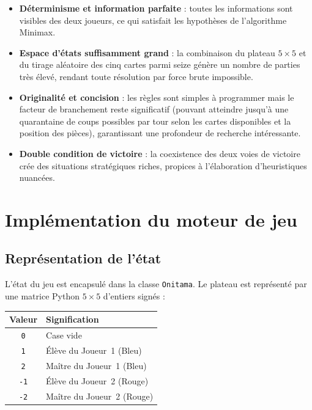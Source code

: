 \documentclass[12pt, a4paper]{article}
\begin{document}
\begin{itemize}
  \item \textbf{Déterminisme et information parfaite} : toutes les informations sont visibles
        des deux joueurs, ce qui satisfait les hypothèses de l'algorithme Minimax.
  \item \textbf{Espace d'états suffisamment grand} : la combinaison du plateau $5\times5$ et
        du tirage aléatoire des cinq cartes parmi seize génère un nombre de parties très élevé,
        rendant toute résolution par force brute impossible.
        \item \textbf{Originalité et concision} : les règles sont simples à programmer mais le facteur de branchement reste significatif (pouvant atteindre jusqu'à une quarantaine de coups possibles par tour selon les cartes disponibles et la position des pièces), garantissant une profondeur de recherche intéressante.
        \item \textbf{Double condition de victoire} : la coexistence des deux voies de victoire
        crée des situations stratégiques riches, propices à l'élaboration d'heuristiques
        nuancées.
\end{itemize}

\section{Implémentation du moteur de jeu}
\label{sec:moteur}

\subsection{Représentation de l'état}

L'état du jeu est encapsulé dans la classe \texttt{Onitama}. Le plateau est représenté par une
matrice Python $5 \times 5$ d'entiers signés :

\begin{center}
\begin{tabular}{cl}
  \toprule
  Valeur & Signification \\
  \midrule
  \texttt{0}  & Case vide \\
  \texttt{1}  & Élève du Joueur~1 (Bleu) \\
  \texttt{2}  & Maître du Joueur~1 (Bleu) \\
  \texttt{-1} & Élève du Joueur~2 (Rouge) \\
  \texttt{-2} & Maître du Joueur~2 (Rouge) \\
  \bottomrule
\end{tabular}
\end{center}
\end{document}
